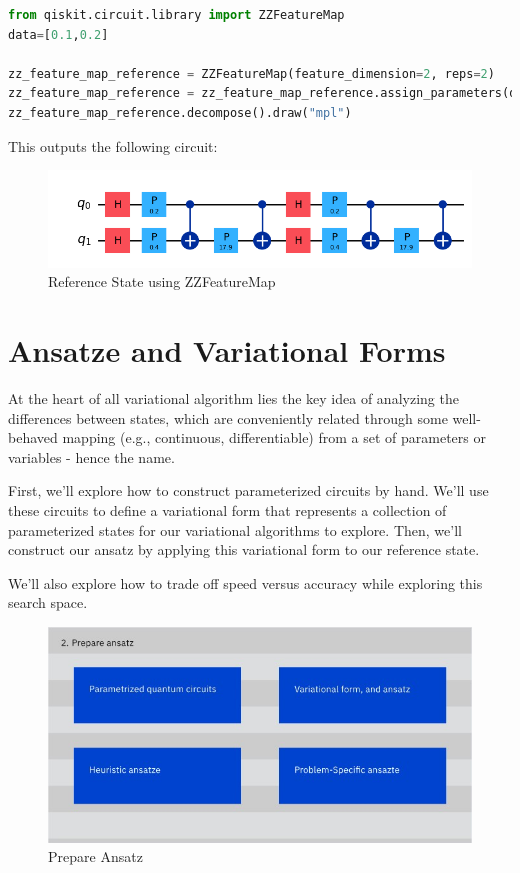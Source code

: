 \documentclass[12pt, oneside]{book}
\theoremstyle{definition}
\theoremstyle{definition}
\theoremstyle{remark}
\begin{document}
\begin{lstlisting}[language=Python]
from qiskit.circuit.library import ZZFeatureMap
data=[0.1,0.2]

zz_feature_map_reference = ZZFeatureMap(feature_dimension=2, reps=2)
zz_feature_map_reference = zz_feature_map_reference.assign_parameters(data)
zz_feature_map_reference.decompose().draw("mpl")
\end{lstlisting}
This outputs the following circuit:
\begin{figure}[H]
    \centering
    \includegraphics[width=0.5\linewidth]{../images/ref_state_zzfmap.png}
    \caption{Reference State using ZZFeatureMap}
    \label{fig:ref_state_zzfmap}
\end{figure}

\section{Ansatze and Variational Forms}
At the heart of all variational algorithm  lies the key idea of analyzing the differences between states, which are conveniently related through some well-behaved mapping (e.g., continuous, differentiable) from a set of parameters or variables - hence the name.

First, we'll explore how to construct parameterized circuits by hand. We'll use these circuits to define a variational form that represents a collection of parameterized states for our variational algorithms to explore. Then, we'll construct our ansatz by applying this variational form to our reference state.

We'll also explore how to trade off speed versus accuracy while exploring this search space.
\begin{figure}
    \centering
    \includegraphics[width=0.5\linewidth]{../images/prep_ansatz.png}
    \caption{Prepare Ansatz}
    \label{fig:prep_ansatz}
\end{figure}
\end{document}
